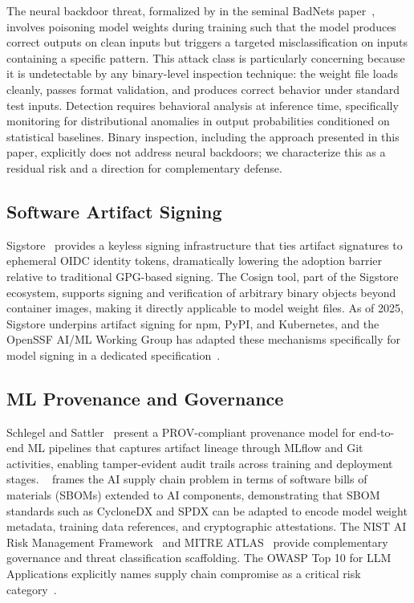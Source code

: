 \documentclass[sigconf,review]{acmart}
\begin{document}
The neural backdoor threat, formalized by \citeauthor{gu2019badnets} in the
seminal BadNets paper~\cite{gu2019badnets}, involves poisoning model weights
during training such that the model produces correct outputs on clean inputs
but triggers a targeted misclassification on inputs containing a specific
pattern. This attack class is particularly concerning because it is
undetectable by any binary-level inspection technique: the weight file loads
cleanly, passes format validation, and produces correct behavior under
standard test inputs. Detection requires behavioral analysis at inference
time, specifically monitoring for distributional anomalies in output
probabilities conditioned on statistical baselines. Binary inspection,
including the approach presented in this paper, explicitly does not address
neural backdoors; we characterize this as a residual risk and a direction
for complementary defense.

\subsection{Software Artifact Signing}

Sigstore~\cite{newman2022sigstore} provides a keyless signing infrastructure
that ties artifact signatures to ephemeral OIDC identity tokens, dramatically
lowering the adoption barrier relative to traditional GPG-based signing. The
Cosign tool, part of the Sigstore ecosystem, supports signing and verification
of arbitrary binary objects beyond container images, making it directly
applicable to model weight files. As of 2025, Sigstore underpins artifact
signing for npm, PyPI, and Kubernetes, and the OpenSSF AI/ML Working Group
has adapted these mechanisms specifically for model signing in a dedicated
specification~\cite{openssf_modelsigning2025}.

\subsection{ML Provenance and Governance}

Schlegel and Sattler~\cite{schlegel2024provenance} present a PROV-compliant
provenance model for end-to-end ML pipelines that captures artifact lineage
through MLflow and Git activities, enabling tamper-evident audit trails
across training and deployment stages. \citeauthor{gentyala2026aisbom}~\cite{gentyala2026aisbom}
frames the AI supply chain problem in terms of software bills of materials
(SBOMs) extended to AI components, demonstrating that SBOM standards such
as CycloneDX and SPDX can be adapted to encode model weight metadata,
training data references, and cryptographic attestations. The NIST AI Risk
Management Framework~\cite{nist_ai_rmf2023} and MITRE ATLAS~\cite{mitre_atlas2023}
provide complementary governance and threat classification scaffolding. The
OWASP Top 10 for LLM Applications explicitly names supply chain compromise
as a critical risk category~\cite{owasp_llm_supply2025}.
\end{document}
